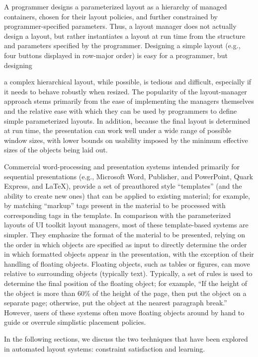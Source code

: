     A programmer designs a parameterized layout as a hierarchy of managed containers, chosen for their layout policies, and further constrained by programmer-specified parameters. Thus, a layout manager does not actually design a layout, but rather instantiates a layout at run time from the structure and parameters specified by the programmer. Designing a simple layout (e.g., four buttons displayed in row-major order) is easy for a programmer, but designing

    a complex hierarchical layout, while possible, is tedious and difficult, especially if it needs to behave robustly when resized. The popularity of the layout-manager approach stems primarily from the ease of implementing the managers themselves and the relative ease with which they can be used by programmers to define simple parameterized layouts. In addition, because the final layout is determined at run time, the presentation can work well under a wide range of possible window sizes, with lower bounds on usability imposed by the minimum effective sizes of the objects being laid out.

    Commercial word-processing and presentation systems intended primarily for sequential presentations (e.g., Microsoft Word, Publisher, and PowerPoint, Quark Express, and LaTeX), provide a set of preauthored style “templates” (and the ability to create new ones) that can be applied to existing material; for example, by matching “markup” tags present in the material to be processed with corresponding tags in the template. In comparison with the parameterized layouts of UI toolkit layout managers, most of these template-based systems are simpler. They emphasize the format of the material to be presented, relying on the order in which objects are specified as input to directly determine the order in which formatted objects appear in the presentation, with the exception of their handling of floating objects. Floating objects, such as tables or figures, can move relative to surrounding objects (typically text). Typically, a set of rules is used to determine the final position of the floating object; for example, “If the height of the object is more than 60\% of the height of the page, then put the object on a separate page; otherwise, put the object at the nearest paragraph break.” However, users of these systems often move floating objects around by hand to guide or overrule simplistic placement policies.

    In the following sections, we discuss the two techniques that have been explored in automated layout systems: constraint satisfaction and learning.

